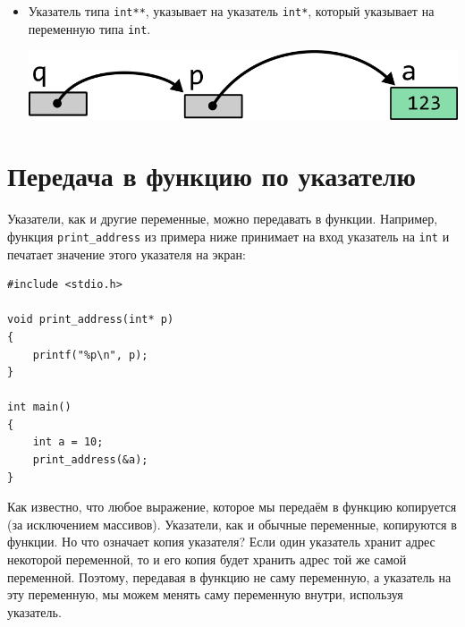 \documentclass{article}
\begin{document}
\begin{itemize}
\item Указатель типа \texttt{int**}, указывает на указатель \texttt{int*}, который указывает на переменную типа \texttt{int}.
\begin{center}
\includegraphics[scale=1]{../images/pointer_tasks/pointer_tasks_pointer_to_pointer.png}
\end{center}
\end{itemize}



\newpage



\newpage
\section*{Передача в функцию по указателю}
Указатели, как и другие переменные, можно передавать в функции.
Например, функция \texttt{print\_address} из примера ниже принимает на вход указатель на \texttt{int} и печатает значение этого указателя на экран:
\begin{lstlisting}
#include <stdio.h>

void print_address(int* p)
{
    printf("%p\n", p);
}

int main()
{
    int a = 10;
    print_address(&a);
}
\end{lstlisting}

Как известно, что любое выражение, которое мы передаём в функцию копируется (за исключением массивов). Указатели, как и обычные переменные, копируются в функции. Но что означает копия указателя? Если один указатель хранит адрес некоторой переменной, то и его копия будет хранить адрес той же самой переменной. Поэтому, передавая в функцию не саму переменную, а указатель на эту переменную, мы можем менять саму переменную внутри, используя указатель.
\end{document}
